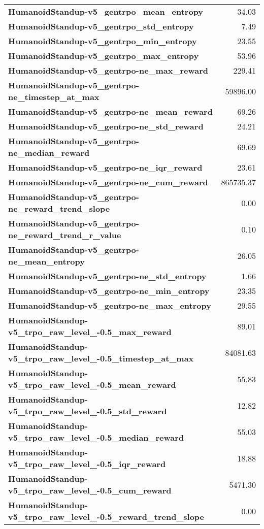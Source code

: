 \begin{tabular}{lr}
\textbf{HumanoidStandup-v5_gentrpo_mean_entropy} & 34.03 \\
\textbf{HumanoidStandup-v5_gentrpo_std_entropy} & 7.49 \\
\textbf{HumanoidStandup-v5_gentrpo_min_entropy} & 23.55 \\
\textbf{HumanoidStandup-v5_gentrpo_max_entropy} & 53.96 \\
\textbf{HumanoidStandup-v5_gentrpo-ne_max_reward} & 229.41 \\
\textbf{HumanoidStandup-v5_gentrpo-ne_timestep_at_max} & 59896.00 \\
\textbf{HumanoidStandup-v5_gentrpo-ne_mean_reward} & 69.26 \\
\textbf{HumanoidStandup-v5_gentrpo-ne_std_reward} & 24.21 \\
\textbf{HumanoidStandup-v5_gentrpo-ne_median_reward} & 69.69 \\
\textbf{HumanoidStandup-v5_gentrpo-ne_iqr_reward} & 23.61 \\
\textbf{HumanoidStandup-v5_gentrpo-ne_cum_reward} & 865735.37 \\
\textbf{HumanoidStandup-v5_gentrpo-ne_reward_trend_slope} & 0.00 \\
\textbf{HumanoidStandup-v5_gentrpo-ne_reward_trend_r_value} & 0.10 \\
\textbf{HumanoidStandup-v5_gentrpo-ne_mean_entropy} & 26.05 \\
\textbf{HumanoidStandup-v5_gentrpo-ne_std_entropy} & 1.66 \\
\textbf{HumanoidStandup-v5_gentrpo-ne_min_entropy} & 23.35 \\
\textbf{HumanoidStandup-v5_gentrpo-ne_max_entropy} & 29.55 \\
\textbf{HumanoidStandup-v5_trpo_raw_level_-0.5_max_reward} & 89.01 \\
\textbf{HumanoidStandup-v5_trpo_raw_level_-0.5_timestep_at_max} & 84081.63 \\
\textbf{HumanoidStandup-v5_trpo_raw_level_-0.5_mean_reward} & 55.83 \\
\textbf{HumanoidStandup-v5_trpo_raw_level_-0.5_std_reward} & 12.82 \\
\textbf{HumanoidStandup-v5_trpo_raw_level_-0.5_median_reward} & 55.03 \\
\textbf{HumanoidStandup-v5_trpo_raw_level_-0.5_iqr_reward} & 18.88 \\
\textbf{HumanoidStandup-v5_trpo_raw_level_-0.5_cum_reward} & 5471.30 \\
\textbf{HumanoidStandup-v5_trpo_raw_level_-0.5_reward_trend_slope} & 0.00 \\

\end{tabular}
